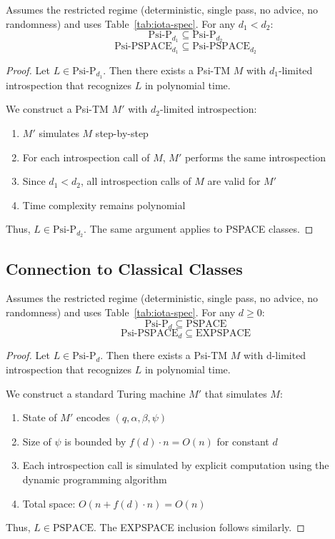 \begin{theorem}
Assumes the restricted regime (deterministic, single pass, no advice, no randomness) and uses Table~\ref{tab:iota-spec}.
For any $d_1 < d_2$:
$$\text{Psi-P}_{d_1} \subseteq \text{Psi-P}_{d_2}$$
$$\text{Psi-PSPACE}_{d_1} \subseteq \text{Psi-PSPACE}_{d_2}$$
\end{theorem}

\begin{proof}
Let $L \in \text{Psi-P}_{d_1}$. Then there exists a Psi-TM $M$ with $d_1$-limited introspection that recognizes $L$ in polynomial time.

We construct a Psi-TM $M'$ with $d_2$-limited introspection:
\begin{enumerate}
\item $M'$ simulates $M$ step-by-step
\item For each introspection call of $M$, $M'$ performs the same introspection
\item Since $d_1 < d_2$, all introspection calls of $M$ are valid for $M'$
\item Time complexity remains polynomial
\end{enumerate}

Thus, $L \in \text{Psi-P}_{d_2}$. The same argument applies to PSPACE classes.
\end{proof}

\subsection{Connection to Classical Classes}

\begin{theorem}
Assumes the restricted regime (deterministic, single pass, no advice, no randomness) and uses Table~\ref{tab:iota-spec}.
For any $d \geq 0$:
$$\text{Psi-P}_d \subseteq \text{PSPACE}$$
$$\text{Psi-PSPACE}_d \subseteq \text{EXPSPACE}$$
\end{theorem}

\begin{proof}
Let $L \in \text{Psi-P}_d$. Then there exists a Psi-TM $M$ with d-limited introspection that recognizes $L$ in polynomial time.

We construct a standard Turing machine $M'$ that simulates $M$:
\begin{enumerate}
\item State of $M'$ encodes $(q, \alpha, \beta, \psi)$
\item Size of $\psi$ is bounded by $f(d) \cdot n = O(n)$ for constant $d$
\item Each introspection call is simulated by explicit computation using the dynamic programming algorithm
\item Total space: $O(n + f(d) \cdot n) = O(n)$
\end{enumerate}

Thus, $L \in \text{PSPACE}$. The EXPSPACE inclusion follows similarly.
\end{proof}

